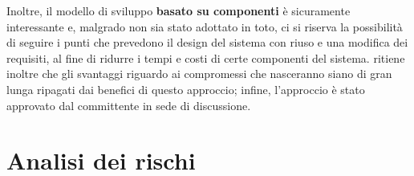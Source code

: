 Inoltre, il modello di sviluppo \textbf{basato su componenti} è sicuramente interessante e, malgrado non sia stato adottato in toto, ci si riserva la possibilità di seguire i punti che prevedono il design del sistema con riuso e una modifica dei requisiti, al fine di ridurre i tempi e costi di certe componenti del sistema. \hx{} ritiene inoltre che gli svantaggi riguardo ai compromessi che nasceranno siano di gran lunga ripagati dai benefici di questo approccio; infine, l'approccio è stato approvato dal committente in sede di discussione.






\section{Analisi dei rischi} \label{sec:rischi}

